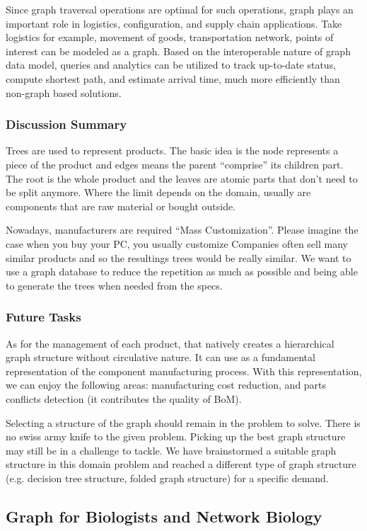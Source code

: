 \documentclass[runningheads]{llncs}
\begin{document}
Since graph traversal operations are optimal for such operations, graph plays an important role in logistics, configuration, and supply chain applications. Take logistics for example, movement of goods, transportation network, points of interest can be modeled as a graph. Based on the interoperable nature of graph data model, queries and analytics can be utilized to track up-to-date status, compute shortest path, and estimate arrival time, much more efficiently than non-graph based solutions.

\subsubsection{Discussion Summary}
Trees are used to represent products. The basic idea is the node represents a piece of the product and edges means the parent “comprise” its children part. The root is the whole product and the leaves are atomic parts that don’t need to be split anymore. Where the limit depends on the domain, usually are components that are raw material or bought outside.

Nowadays, manufacturers are required “Mass Customization”. Please imagine the case when you buy your PC, you usually customize  Companies often sell many similar products and so the resultings trees would be really similar. We want to use a graph database to reduce the repetition as much as possible and being able to generate the trees when needed from the specs.

\subsubsection{Future Tasks}
As for the management of each product, that natively creates a hierarchical graph structure without circulative nature. It can use as a fundamental representation of the component manufacturing process. With this representation, we can enjoy the following areas:
manufacturing cost reduction, and
parts conflicts detection (it contributes the quality of BoM).

Selecting a structure of the graph should remain in the problem to solve. There is no swiss army knife to the given problem. Picking up the best graph structure may still be in a challenge to tackle. We have brainstormed a suitable graph structure in this domain problem and reached a different type of graph structure (e.g. decision tree structure, folded graph structure) for a specific demand. 


\subsection{Graph for Biologists and Network Biology}
\end{document}
